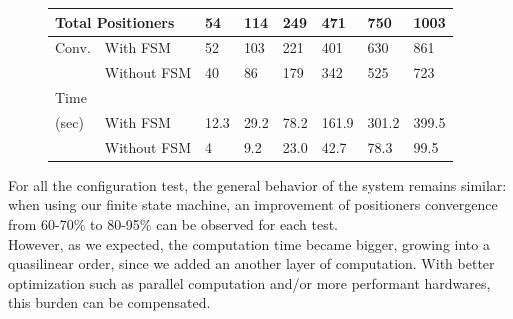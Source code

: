\documentclass[]{spie}  %
\begin{document}
\begin{figure}[H]
\begin{minipage}{9cm}
{\begin{tabular}{|l|l|l|l|l|l|l|l|}
					\hline
					\multicolumn{2}{|l|}{Total Positioners}  & 54 & 114 & 249 & 471 & 750 & 1003\\
					\hline
					Conv. & With FSM  & 52 & 103 & 221 & 401 & 630 & 861 \\
					\cline{2-8}
					& Without FSM & 40  & 86 & 179 & 342 & 525 & 723 \\
					\hline
					Time\\(sec) & With FSM  & 12.3 & 29.2 & 78.2 & 161.9 & 301.2 & 399.5 \\
					\cline{2-8}
					& Without FSM  & 4  & 9.2 & 23.0 & 42.7 & 78.3  & 99.5 \\
					\hline
				\end{tabular}}
			\end{minipage}
		\end{figure}					
	For all the configuration test, the general behavior of the system remains similar: when using our finite state machine, an improvement of positioners convergence from 60-70\% to 80-95\% can be observed for each test.\\
	 However, as we expected, the computation time became bigger, growing into a quasilinear order, since we added an another layer of computation. With better optimization such as parallel computation and/or more performant hardwares, this burden can be compensated.
	 
	
	
\end{document}
